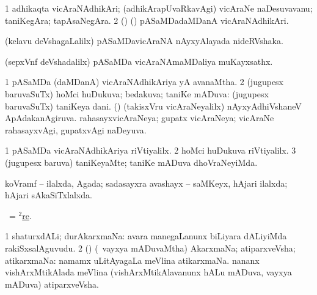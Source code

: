 \bentry
{}
\gl{\nA}
\bmng
\bnum
\num{1} adhikaqta vicAraNAdhikAri; (adhikArapUvaRkavAgi) vicAraNe naDesuvavanu; taniKegAra; tapAsaNegAra. 
\num{2} (\ca) (\roVkAyx) pASaMDadaMDanA vicAraNAdhikAri. 
\enum
\emng

\noindent 
\gl{\pagu}
\bmng
{} (kelavu deVshagaLalilx) pASaMDavicAraNA nAyxyAlayada nideRVshaka. 
\emng
\eentry

\bentry
{}
\gl{\nA}
\bmng
(sepxVnf deVshadalilx) pASaMDa vicAraNAmaMDaliya muKayxsathx. 
\emng
\eentry

\bentry
{}
\gl{\gu}
\bmng
\bnum
\num{1} pASaMDa (daMDanA) vicAraNAdhikAriya yA avanaMtha. 
\num{2} (jugupesx baruvaSuTx) hoMci huDukuva; bedakuva; taniKe mADuva:  (jugupesx baruvaSuTx) taniKeya dani. 
 (\nAyxshA) (takisxVru vicAraNeyalilx) 
\banum
{} nAyxyAdhiVshaneV ApAdakanAgiruva. 
 rahasayxvicAraNeya; gupatx vicAraNeya; vicAraNe rahasayxvAgi, gupatxvAgi naDeyuva. 
\eanum
\numie
\enum
\emng
\eentry

\bentry
{}
\gl{\kirxvi}
\bmng
\bnum
\num{1} pASaMDa vicAraNAdhikAriya riVtiyalilx. 
\num{2} hoMci huDukuva riVtiyalilx. 
\num{3} (jugupesx baruva) taniKeyaMte; taniKe mADuva dhoVraNeyiMda. 
\enum
\emng
\eentry

\bentry
{}
\gl{\gu}
\bmng
koVramf -- ilalxda, Agada; sadasayxra avashayx -- saMKeyx, hAjari ilalxda; hAjari sAkaSiTxlalxda. 
\emng
\eentry

\bentry
{}
\gl{\upa}
\bmng
\Latin\ = \hyperref{kandict_r.pdf}{R}{re(2)}{$^2$re}. 
\emng
\eentry

\bentry
{}
\gl{\saMkiSx}
\bmng
{} 
\emng
\eentry

\bentry
{}
\gl{\nA}
\bmng
\bnum
\num{1} shaturxdALi; durAkarxmaNa:  avara manegaLanunx biLiyara dALiyiMda rakiSxsalAguvudu. 
\num{2} (\rUpa) (\kanmu\ vayxya mADuvaMtha) AkarxmaNa; atiparxveVsha; atikarxmaNa:  namamx uLitAyagaLa meVlina atikarxmaNa.  nananx vishArxMtikAlada meVlina (vishArxMtikAlavanunx hALu mADuva, vayxya mADuva) atiparxveVsha. 
\enum
\emng
\eentry

